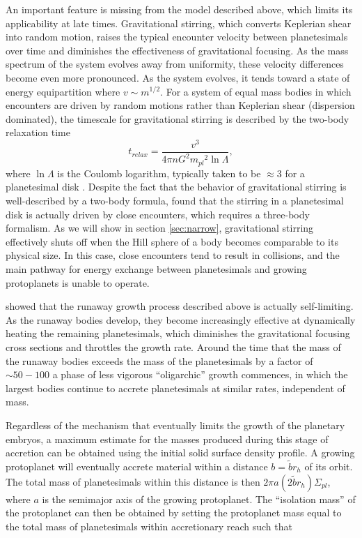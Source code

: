 An important feature is missing from the model described above, which
limits its applicability at late times. Gravitational stirring, which converts
Keplerian shear into random motion, raises the typical encounter velocity
between planetesimals over time \cite{weidenschilling89, ida90} and diminishes the effectiveness of gravitational
focusing. As the mass spectrum of the system evolves away from uniformity, these velocity differences become even more
pronounced. As the system evolves, it tends toward a state of
energy equipartition where $v \sim m^{1/2}$. For a system of equal mass bodies in which encounters are driven by random 
motions rather than Keplerian shear (dispersion dominated), the timescale for gravitational stirring is described by the two-body 
relaxation time \cite{ida93}
\begin{equation}\label{eq:relax}
	t_{relax} = \frac{v^3}{4 \pi n G^2 {m_{pl}}^2 \ln \Lambda},
\end{equation}
where $\ln \Lambda$ is the Coulomb logarithm,
typically taken to be $\approx 3$ for a planetesimal disk \cite{ida90, stewart00}. Despite
the fact that the behavior of gravitational stirring is well-described
by a two-body formula, \cite{ida93} found that the stirring in a planetesimal disk is actually driven by close encounters, which 
requires a three-body formalism. As we will show in section \ref{sec:narrow}, gravitational stirring effectively shuts off when the 
Hill sphere of a body becomes comparable to its physical size. In this case, close encounters tend to result in collisions, and the 
main pathway for energy exchange between planetesimals and growing protoplanets is unable to operate.

\cite{kokubo98} showed that the runaway growth process described above is actually self-limiting. As the runaway
bodies develop, they become increasingly effective at dynamically heating the
remaining planetesimals, which diminishes the
gravitational focusing cross sections and throttles the growth rate. Around the time
that the mass of the runaway bodies exceeds the mass of the planetesimals
by a factor of $\sim 50-100$
\cite{ida93} a phase of less vigorous ``oligarchic'' 
growth commences, in which the largest bodies continue to 
accrete planetesimals at similar rates, independent of mass.

Regardless of the mechanism that eventually limits the growth of the planetary embryos, a maximum estimate for the masses produced during this 
stage of accretion can be obtained using the initial solid surface density profile. A growing protoplanet will eventually accrete material within a distance
$b = \tilde{b} r_{h}$ of its orbit. The total mass of planetesimals
within this distance is then $2 \pi a \left(2 \tilde{b} r_{h} \right)
\Sigma_{pl}$, where $a$ is the semimajor axis of the growing protoplanet. The ``isolation mass'' of the protoplanet can then be obtained by setting the protoplanet mass equal to the total mass of planetesimals within accretionary reach such that

